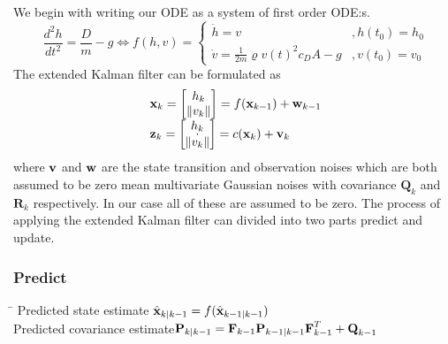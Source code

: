 We begin with writing our ODE as a system of first order ODE:s.
\begin{equation*}
	\frac{d^2h}{dt^2} = \frac{D}{m} - g \Longleftrightarrow f(h,v)=
	\left\lbrace
	\begin{array}{ll}
		\dot{h}= v & , h(t_0)=h_0 \\
		\dot{v}= \frac{1}{2m}\varrho v(t)^2c_DA-g& , v(t_0)=v_0
	\end{array}
	\right.
\end{equation*}
The extended Kalman filter can be formulated as
\begin{equation*}
	\begin{array}{l}
		\textbf{x}_k = \left[ \begin{matrix} h_{k} \\ \| v_{k} \| \end{matrix}\right]= f(\textbf{x}_{k-1})+\textbf{w}_{k-1}\\
		\textbf{z}_k = \left[ \begin{matrix} h_{k} \\ \dot{\| v_{k} \|} \end{matrix}\right]=  c(\textbf{x}_k)+\textbf{v}_k
	\end{array}
\end{equation*}
where $\textbf{v}$ and $\textbf{w}$ are the state transition and observation noises which are both assumed to be zero mean multivariate Gaussian noises with covariance $\textbf{Q}_k$ and $\textbf{R}_k$ respectively. In our case all of these are assumed to be zero.
The process of applying the extended Kalman filter can divided into two parts predict and update.\\
\subsubsection*{Predict}
\begin{tabbing}
\hspace{6cm}\=\kill
Predicted state estimate \> $\hat{\textbf{x}}_{k|k-1}=f(\hat{\textbf{x}}_{k-1|k-1})$ \\
Predicted covariance estimate\>$\textbf{P}_{k|k-1} = \textbf{F}_{k-1}\textbf{P}_{k-1|k-1}\textbf{F}_{k-1}^T+\textbf{Q}_{k-1}$
\end{tabbing}
